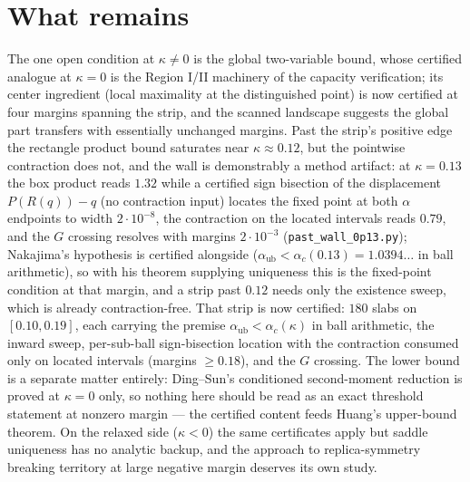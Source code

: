 \documentclass[11pt]{article}
\theoremstyle{remark}
\begin{document}
\section{What remains}\label{sec:remains}

The one open condition at $\kappa\neq0$ is the global two-variable
bound, whose certified analogue at $\kappa=0$ is the Region I/II
machinery of the capacity verification; its center ingredient (local
maximality at the distinguished point) is now certified at four
margins spanning the strip, and the scanned landscape suggests the
global part transfers with essentially unchanged margins.  Past the
strip's positive edge the rectangle product bound saturates near
$\kappa\approx0.12$, but the pointwise contraction does not, and the
wall is demonstrably a method artifact: at $\kappa=0.13$ the box
product reads $1.32$ while a certified sign bisection of the
displacement $P(R(q))-q$ (no contraction input) locates the fixed
point at both $\alpha$ endpoints to width $2\cdot10^{-8}$, the
contraction on the located intervals reads $0.79$, and the $G$
crossing resolves with margins $2\cdot10^{-3}$
(\texttt{past\_wall\_0p13.py}); Nakajima's hypothesis is certified
alongside ($\alpha_{\mathrm{ub}}<\alpha_c(0.13)=1.0394\ldots$ in ball
arithmetic), so with his theorem supplying uniqueness this is the
fixed-point condition at that margin, and a strip past $0.12$ needs
only the existence sweep, which is already contraction-free.  That
strip is now certified: $180$ slabs on $[0.10,0.19]$, each carrying
the premise $\alpha_{\mathrm{ub}}<\alpha_c(\kappa)$ in ball
arithmetic, the inward sweep, per-sub-ball sign-bisection location
with the contraction consumed only on located intervals (margins
$\ge0.18$), and the $G$ crossing.  The lower bound is a
separate matter entirely: Ding--Sun's conditioned second-moment
reduction is proved at $\kappa=0$ only, so nothing here should be read
as an exact threshold statement at nonzero margin --- the certified
content feeds Huang's upper-bound theorem.  On the relaxed side
($\kappa<0$) the same certificates apply but saddle uniqueness has no
analytic backup, and the approach to replica-symmetry breaking
territory at large negative margin deserves its own study.
\end{document}
